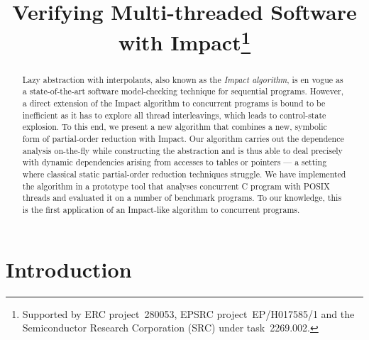 \documentclass[conference]{IEEEtran}
\begin{document}
\title{Verifying Multi-threaded Software with Impact\thanks{Supported by ERC project~280053, EPSRC
project~EP/H017585/1 and the Semiconductor Research Corporation (SRC) under
task~2269.002.}}

\author{
\and
{}
\and
{}
}


\maketitle
\begin{abstract}
Lazy abstraction with interpolants,
also known as the \emph{Impact algorithm},
is en vogue as a state-of-the-art software model-checking technique for sequential programs.
However, a direct extension of the Impact algorithm 
to concurrent programs is bound to
be inefficient as it has to explore all thread interleavings,
which leads to control-state explosion.
To this end, we present a new algorithm that combines
a new, symbolic form of partial-order reduction with Impact.
Our algorithm carries out the dependence analysis
on-the-fly while constructing the abstraction
and is thus able to deal precisely with dynamic dependencies
arising from accesses to tables or pointers
--- a setting where classical static partial-order reduction techniques struggle.
We have implemented the algorithm in a prototype
tool that analyses concurrent C program with POSIX threads 
and evaluated it on a number of benchmark programs. 
To our knowledge, this is the first application
of an Impact-like algorithm to concurrent programs.
\end{abstract}

\section{Introduction}
\end{document}
